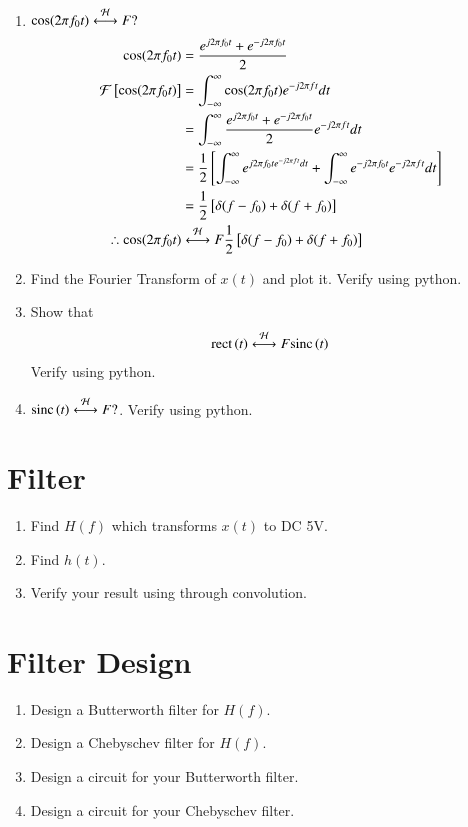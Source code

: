 \documentclass[journal,12pt,twocolumn]{IEEEtran}
\renewcommand\thesection{\arabic{section}}
\begin{document}
\begin{enumerate}[label=\thesection.\arabic*
	,ref=\thesection.\theenumi]
	 By applying the shifting property of impulse 
	 \begin{align}
		f(t) &= e^{-j2\pi f_0t}\\
		i.e., \quad e^{-j2\pi f_0t} &\system{F} \delta(f+f_0)
	 \end{align}
	 \item $\cos(2\pi f_0t)\overset{\mathcal{H}}{ \longleftrightarrow}{F}?$\\
	 \solution \begin{align}
		\cos(2\pi f_0t) &= \frac{e^{j2\pi f_0t}+e^{-j2\pi f_0t}}{2}\\
		\mathcal{F}{}\left[\cos(2\pi f_0t)\right] &= \int_{-\infty}^\infty \cos(2\pi f_0t) e^{-j2\pi ft}dt\\
		&= \int_{-\infty}^\infty \frac{e^{j2\pi f_0t}+e^{-j2\pi f_0t}}{2} e^{-j2\pi ft}dt\\
		&= \frac{1}{2}{}\left[\int_{-\infty}^\infty e^{j2\pi f_0te^{-j2\pi ft}dt}+ \int_{-\infty}^\infty e^{-j2\pi f_0t}e^{-j2\pi ft}dt\right]\\
		&= \frac{1}{2}{}\left[\delta(f-f_0)+\delta(f+f_0)\right]\\
		\therefore \cos(2\pi f_0t)&\overset{\mathcal{H}}{ \longleftrightarrow}{F}\frac{1}{2}{}\left[\delta(f-f_0)+\delta(f+f_0)\right]
	 \end{align}
	 \item Find the Fourier Transform of $x(t)$ and plot it.  Verify using python.
	 \item Show that 
	 \begin{align}
		 \text{rect}\left(t\right) \overset{\mathcal{H}}{ \longleftrightarrow}{F} \text{sinc}\left(t\right)
	 \end{align}
	 Verify using python.
	 \item $\text{sinc}\left(t\right)\overset{\mathcal{H}}{ \longleftrightarrow}{F} ?$.  Verify using python.
	\end{enumerate}

	\section{Filter}

\begin{enumerate}[label=\thesection.\arabic*
	,ref=\thesection.\theenumi]
	\item Find $H(f)$ which transforms $x(t)$ to DC 5V.
	\item Find $h(t)$.
	\item Verify your result using  through convolution.
	\end{enumerate}

\section{Filter Design}
\begin{enumerate}[label=\thesection.\arabic*
,ref=\thesection.\theenumi]
\item Design a Butterworth filter for $H(f)$.
\item Design a Chebyschev filter for $H(f)$.
\item Design a circuit for your Butterworth filter.
\item Design a circuit for your Chebyschev filter.
\end{enumerate}
\end{document}
